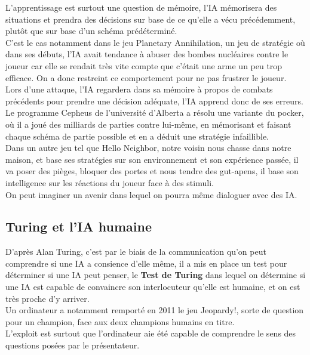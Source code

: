 \documentclass[a4paper,10pt,final,fleqn]{article}
\begin{document}
		L'apprentissage est surtout une question de mémoire, l'IA mémorisera des situations et prendra des décisions sur base de ce qu'elle a vécu précédemment, plutôt que sur base d'un schéma prédéterminé.\\
		C'est le cas notamment dans le jeu Planetary Annihilation, un jeu de stratégie où dans ses débuts, l'IA avait tendance à abuser des bombes nucléaires contre le joueur car elle se rendait très vite compte que c'était une arme un peu trop efficace. On a donc restreint ce comportement pour ne pas frustrer le joueur.\\
		Lors d'une attaque, l'IA regardera dans sa mémoire à propos de combats précédents pour prendre une décision adéquate, l'IA apprend donc de ses erreurs.\\

		Le programme Cepheus de l'université d'Alberta a résolu une variante du pocker, où il a joué des milliards de parties contre lui-même, en mémorisant et faisant chaque schéma de partie possible et en a déduit une stratégie infaillible.\\

		Dans un autre jeu tel que Hello Neighbor, notre voisin nous chasse dans notre maison, et base ses stratégies sur son environnement et son expérience passée, il va poser des pièges, bloquer des portes et nous tendre des gut-apens, il base son intelligence sur les réactions du joueur face à des stimuli.\\

		On peut imaginer un avenir dans lequel on pourra même dialoguer avec des IA.\\

	\subsection{Turing et l'IA humaine}

		D'après Alan Turing, c'est par le biais de la communication qu'on peut comprendre si une IA a consience d'elle même, il a mis en place un test pour déterminer si une IA peut penser, le \textbf{Test de Turing} dans lequel on détermine si une IA est capable de convaincre son interlocuteur qu'elle est humaine, et on est très proche d'y arriver.\\

		Un ordinateur a notamment remporté en 2011 le jeu Jeopardy!, sorte de question pour un champion, face aux deux champions humains en titre.\\
		L'exploit est surtout que l'ordinateur aie été capable de comprendre le sens des questions posées par le présentateur.\\
\end{document}
